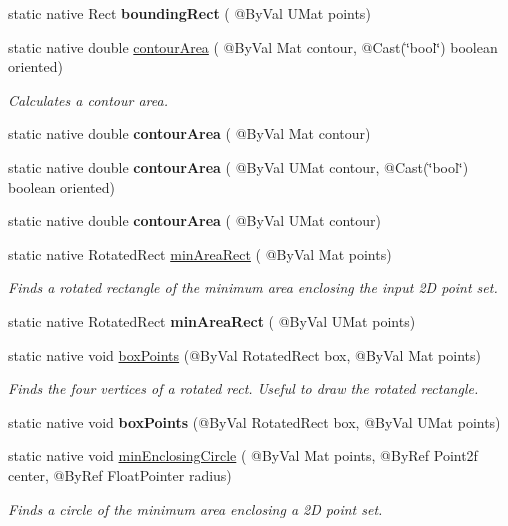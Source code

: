 \begin{DoxyCompactItemize}
static native Rect {\bfseries bounding\+Rect} ( @By\+Val U\+Mat points)
\item 
static native double \hyperlink{group__imgproc__shape_ga5de110872b0023d4176fcc7c3f2c6115}{contour\+Area} ( @By\+Val Mat contour, @Cast(\char`\"{}bool\char`\"{}) boolean oriented)
\begin{DoxyCompactList}\small\item\em Calculates a contour area. \end{DoxyCompactList}\item 
static native double {\bfseries contour\+Area} ( @By\+Val Mat contour)
\item 
static native double {\bfseries contour\+Area} ( @By\+Val U\+Mat contour, @Cast(\char`\"{}bool\char`\"{}) boolean oriented)
\item 
static native double {\bfseries contour\+Area} ( @By\+Val U\+Mat contour)
\item 
static native Rotated\+Rect \hyperlink{group__imgproc__shape_gae621046d95a8ba9f1e1ce112ab8de61a}{min\+Area\+Rect} ( @By\+Val Mat points)
\begin{DoxyCompactList}\small\item\em Finds a rotated rectangle of the minimum area enclosing the input 2D point set. \end{DoxyCompactList}\item 
static native Rotated\+Rect {\bfseries min\+Area\+Rect} ( @By\+Val U\+Mat points)
\item 
static native void \hyperlink{group__imgproc__shape_ga02ee8d410547c387ed348bbb9c2fc213}{box\+Points} (@By\+Val Rotated\+Rect box, @By\+Val Mat points)
\begin{DoxyCompactList}\small\item\em Finds the four vertices of a rotated rect. Useful to draw the rotated rectangle. \end{DoxyCompactList}\item 
static native void {\bfseries box\+Points} (@By\+Val Rotated\+Rect box, @By\+Val U\+Mat points)
\item 
static native void \hyperlink{group__imgproc__shape_ga6247e734952a578322d69260230c4a41}{min\+Enclosing\+Circle} ( @By\+Val Mat points, @By\+Ref Point2f center, @By\+Ref Float\+Pointer radius)
\begin{DoxyCompactList}\small\item\em Finds a circle of the minimum area enclosing a 2D point set. \end{DoxyCompactList}\item 

\end{DoxyCompactItemize}
